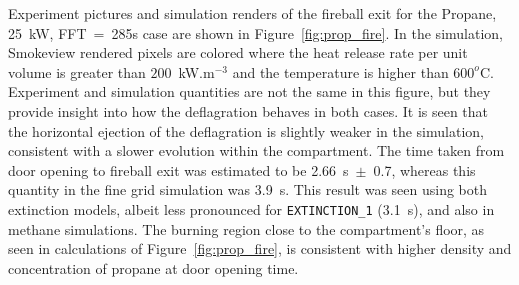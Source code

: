 \documentclass[12pt,letterpaper]{article}
\begin{document}
\begin{flushleft}
Experiment pictures and simulation renders of the fireball exit for the Propane, 25~kW, FFT~=~285s case are shown in Figure~\ref{fig:prop_fire}. In the simulation, Smokeview rendered pixels are colored where the heat release rate per unit volume is greater than $200$~kW.m$^{-3}$ and the temperature is higher than $600^o$C. Experiment and simulation quantities are not the same in this figure, but they provide insight into how the deflagration behaves in both cases. It is seen that the horizontal ejection of the deflagration is slightly weaker in the simulation, consistent with a slower evolution within the compartment. The time taken from door opening to fireball exit was estimated to be 2.66~s~$\pm$~0.7, whereas this quantity in the fine grid simulation was 3.9~s. 
This result was seen using both extinction models, albeit less pronounced for \texttt{EXTINCTION\_1} (3.1~s), and also in 
methane simulations. The burning region close to the compartment's floor, as seen in calculations of Figure~\ref{fig:prop_fire}, is consistent with higher density and concentration of propane at door opening time.


\end{flushleft}
\end{document}
